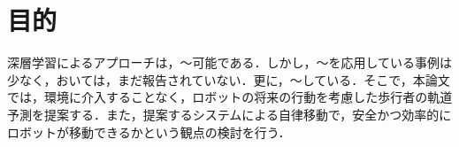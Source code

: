 
\section{目的}
深層学習によるアプローチは，〜可能である．しかし，〜を応用している事例は少なく，おいては，まだ報告されていない．更に，〜している．そこで，本論文では，環境に介入することなく，ロボットの将来の行動を考慮した歩行者の軌道予測を提案する．また，提案するシステムによる自律移動で，安全かつ効率的にロボットが移動できるかという観点の検討を行う．

